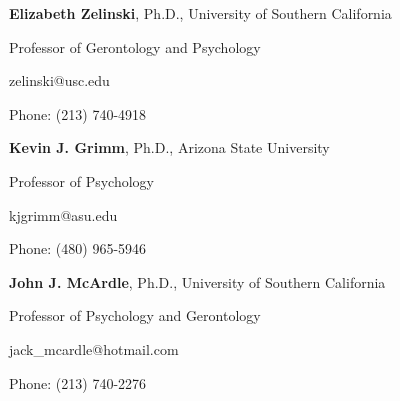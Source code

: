\documentclass[letterpaper,10pt]{article}
\begin{document}
   \begin{center}
    \parbox{6.5in}{\textbf{Elizabeth Zelinski}, Ph.D., University of Southern California}
    \parbox{6.5in}{Professor of Gerontology and Psychology}
    \parbox{6.5in}{zelinski@usc.edu}
    \parbox{6.5in}{Phone: (213) 740-4918}
    \end{center}
      \begin{center}
      	\parbox{6.5in}{\textbf{Kevin J. Grimm}, Ph.D., Arizona State University}
      	\parbox{6.5in}{Professor of Psychology}
      	\parbox{6.5in}{kjgrimm@asu.edu}
      	\parbox{6.5in}{Phone: (480) 965-5946 }
      \end{center} 
        \begin{center}
        	\parbox{6.5in}{\textbf{John J. McArdle}, Ph.D., University of Southern California}
        	\parbox{6.5in}{Professor of Psychology and Gerontology}
        	\parbox{6.5in}{jack\_mcardle@hotmail.com}
        	\parbox{6.5in}{Phone: (213) 740-2276 }
        \end{center} 
\end{document}

